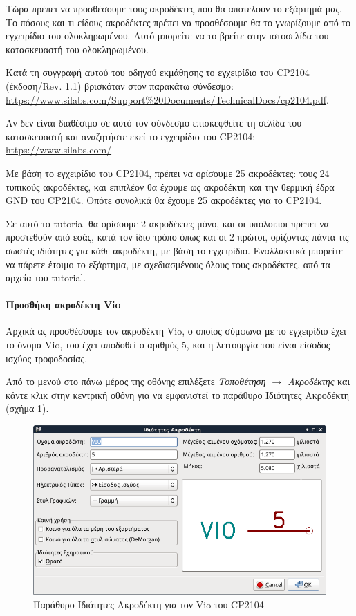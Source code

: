 \documentclass[a4paper]{article}
\begin{document}
Τώρα πρέπει να προσθέσουμε τους ακροδέκτες που θα αποτελούν το εξάρτημά μας. Το πόσους και τι είδους ακροδέκτες πρέπει να προσθέσουμε θα το γνωρίζουμε από το εγχειρίδιο του ολοκληρωμένου. Αυτό μπορείτε να το βρείτε στην ιστοσελίδα του κατασκευαστή του ολοκληρωμένου. 

Κατά τη συγγραφή αυτού του οδηγού εκμάθησης το εγχειρίδιο του CP2104 (έκδοση/Rev. 1.1) βρισκόταν στον παρακάτω σύνδεσμο:\\
\href{https://www.silabs.com/Support\%20Documents/TechnicalDocs/cp2104.pdf}{https://www.silabs.com/Support\%20Documents/TechnicalDocs/cp2104.pdf}. 

Αν δεν είναι διαθέσιμο σε αυτό τον σύνδεσμο επισκεφθείτε τη σελίδα του κατασκευαστή και αναζητήστε εκεί το εγχειρίδιο του CP2104: \\
\href{https://www.silabs.com/}{https://www.silabs.com/}

Με βάση το εγχειρίδιο του CP2104, πρέπει να ορίσουμε 25 ακροδέκτες: τους 24 τυπικούς ακροδέκτες, και επιπλέον θα έχουμε ως ακροδέκτη και την θερμική έδρα GND του CP2104. Οπότε συνολικά θα έχουμε 25 ακροδέκτες για το CP2104.

Σε αυτό το tutorial θα ορίσουμε 2 ακροδέκτες μόνο, και οι υπόλοιποι πρέπει να προστεθούν από εσάς, κατά τον ίδιο τρόπο όπως και οι 2 πρώτοι, ορίζοντας πάντα τις σωστές ιδιότητες για κάθε ακροδέκτη, με βάση το εγχειρίδιο. Εναλλακτικά μπορείτε να πάρετε έτοιμο το εξάρτημα, με σχεδιασμένους όλους τους ακροδέκτες, από τα αρχεία του tutorial.

\paragraph{Προσθήκη ακροδέκτη Vio}

Αρχικά ας προσθέσουμε τον ακροδέκτη Vio, ο οποίος σύμφωνα με το εγχειρίδιο έχει το όνομα Vio, του έχει αποδοθεί ο αριθμός 5, και η λειτουργία του είναι είσοδος ισχύος τροφοδοσίας.

Από το μενού στο πάνω μέρος της οθόνης επιλέξετε \textit{Τοποθέτηση $\rightarrow$ Ακροδέκτης} και κάντε κλικ στην κεντρική οθόνη για να εμφανιστεί το παράθυρο Ιδιότητες Ακροδέκτη (σχήμα \ref{fig:libed-dial-viocompprop}).

\begin{figure}
  \begin{center}
    \includegraphics[width=.5\textwidth]{img/libed-dial-viocompprop.png}
    \caption{Παράθυρο Ιδιότητες Ακροδέκτη για τον Vio του CP2104}
    \label{fig:libed-dial-viocompprop}
  \end{center}
\end{figure}
\end{document}
